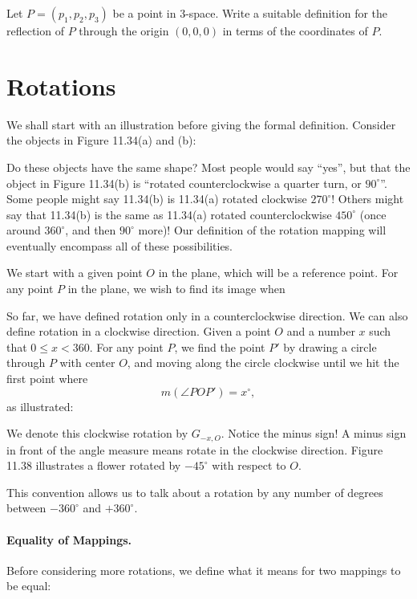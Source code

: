 \documentclass[12pt]{book} %
\begin{document}
\begin{ExerciseList}
\begin{ExerciseList}
Let $P=(p_1,p_2,p_3)$ be a point in 3-space. Write a suitable definition for the reflection of $P$ through the origin $(0,0,0)$ in terms of the coordinates of $P$.
\end{ExerciseList}

\section{Rotations}

We shall start with an illustration before giving the formal definition.
Consider the objects in Figure 11.34(a) and (b):


Do these objects have the same shape? Most people would say ``yes'', but that the object in Figure 11.34(b) is ``rotated counterclockwise a quarter turn, or $90^\circ$''. Some people might say 11.34(b) is 11.34(a) rotated clockwise $270^\circ$! Others might say that 11.34(b) is the same as 11.34(a) rotated counterclockwise $450^\circ$ (once around $360^\circ$, and then $90^\circ$ more)! Our definition of the rotation mapping will eventually encompass all of these possibilities.

We start with a given point $O$ in the plane, which will be a reference point. For any point $P$ in the plane, we wish to find its image when

So far, we have defined rotation only in a counterclockwise direction.
We can also define rotation in a clockwise direction. Given a point $O$
and a number $x$ such that $0\le x<360$. For any point $P$, we find the
point $P'$ by drawing a circle through $P$ with center $O$, and moving along
the circle clockwise until we hit the first point where
\[
m(\angle POP')=x^\circ,
\]
as illustrated:


We denote this clockwise rotation by $G_{-x,O}$. Notice the minus sign! A
minus sign in front of the angle measure means rotate in the clockwise
direction. Figure 11.38 illustrates a flower rotated by $-45^\circ$ with respect
to $O$.


This convention allows us to talk about a rotation by any number of degrees between $-360^\circ$ and $+360^\circ$.

\paragraph{Equality of Mappings.}
Before considering more rotations, we define what it means for two mappings to be equal:


\end{ExerciseList}
\end{document}
